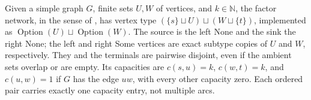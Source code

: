 \begin{definition}
Given a simple graph $G$, finite sets $U,W$ of vertices, and $k\in\mathbb N$,
the factor network, in the sense of , has
vertex type $(\{s\}\sqcup U)\sqcup(W\sqcup\{t\})$, implemented as
$\operatorname{Option}(U)\sqcup\operatorname{Option}(W)$.
The source is the left None and the sink the right None; the left and
right Some vertices are exact subtype copies of $U$ and $W$, respectively.
They and the terminals are pairwise disjoint, even if the ambient sets
overlap or are empty. Its capacities are $c(s,u)=k$, $c(w,t)=k$, and
$c(u,w)=1$ if $G$ has the edge $uw$, with every other capacity zero.
Each ordered pair carries exactly one capacity entry, not multiple arcs.
\end{definition}

